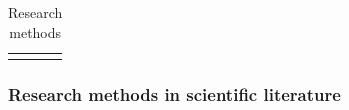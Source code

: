 \documentclass[english, 12pt, a4paper, sci, utf8, a-1b, online]{aaltothesis}
\begin{document}
\begin{center}
\begin{longtable}{p{0.3\linewidth}p{0.6\linewidth}}
    \caption{Research methods}                                                                                                                                                                                                                                                                                                                                                                                                                                                                                                                                                                                                                                                                                                                                                                                                                                                                                                                                                                        \\
    \label{table:research-methods}                                                                                                                                                                                                                                                                                                                                                                                                                                                                                                                                                                                                                                                                                                                                                                                                                                                                                                                                                                    \\
  \end{longtable}
\end{center}
\renewcommand{\arraystretch}{1}

\subsubsection{Research methods in scientific literature}
\end{document}
